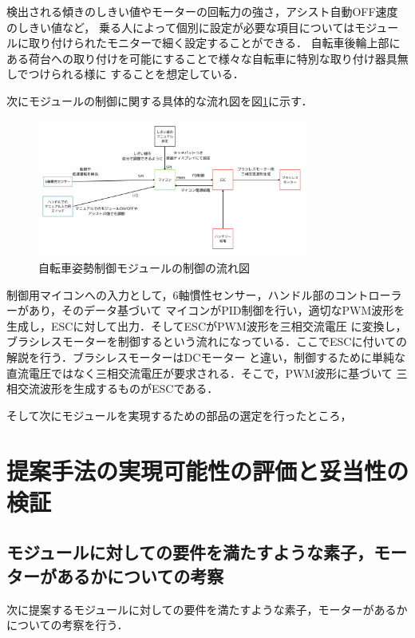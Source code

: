 \documentclass[uplatex,dvipdfmx]{jsarticle}
\begin{document}
検出される傾きのしきい値やモーターの回転力の強さ，アシスト自動OFF速度のしきい値など，
乗る人によって個別に設定が必要な項目についてはモジュールに取り付けられたモニターで細く設定することができる．
自転車後輪上部にある荷台への取り付けを可能にすることで様々な自転車に特別な取り付け器具無しでつけられる様に
することを想定している．

次にモジュールの制御に関する具体的な流れ図を図\ref{fig:nagare}に示す．
\begin{figure}[H]
    \centering
    \includegraphics[width=0.8\textwidth]{fig/nagare.png}
    \caption{自転車姿勢制御モジュールの制御の流れ図}
    \label{fig:nagare}
\end{figure}

制御用マイコンへの入力として，6軸慣性センサー，ハンドル部のコントローラーがあり，そのデータ基づいて
マイコンがPID制御を行い，適切なPWM波形を生成し，ESCに対して出力．そしてESCがPWM波形を三相交流電圧
に変換し，ブラシレスモーターを制御するという流れになっている．ここでESCに付いての解説を行う．ブラシレスモーターはDCモーター
と違い，制御するために単純な直流電圧ではなく三相交流電圧が要求される．そこで，PWM波形に基づいて
三相交流波形を生成するものがESCである．

そして次にモジュールを実現するための部品の選定を行ったところ，

\section{提案手法の実現可能性の評価と妥当性の検証}



\subsection{モジュールに対しての要件を満たすような素子，モーターがあるかについての考察}\label{subsec:youken}


次に提案するモジュールに対しての要件を満たすような素子，モーターがあるかについての考察を行う．
\end{document}
